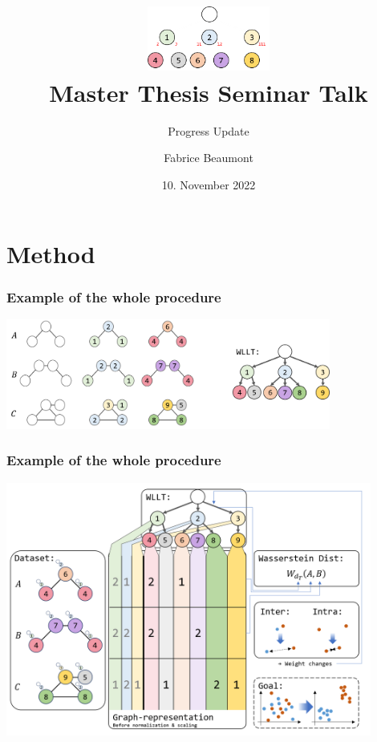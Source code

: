

\title[MA Seminar Talk - Progress]{
	\centering
	\includegraphics[width=0.3\textwidth]{images/WLLT}\\
	Master Thesis Seminar Talk	
}
\subtitle{Progress Update}
\author[F. Beaumont]{Fabrice Beaumont}
\date{10. November 2022}

\newcommand{\figureWidth}{7cm}
\newcommand{\figureHorizontal}{2cm}
\newcommand{\figureVertical}{5cm}


\begin{frame}
	\titlepage
\end{frame}

\section{Method}


\begin{frame}
\frametitle{Example of the whole procedure}
\centering
\includegraphics[width=0.8\textwidth]{images/WL_labeling_iterations}
\end{frame}


\begin{frame}
	\frametitle{Example of the whole procedure}\vspace{-0.75cm}
	\centering
	\includegraphics[width=0.9\textwidth]{images/WLLTProgram6}
\end{frame}

